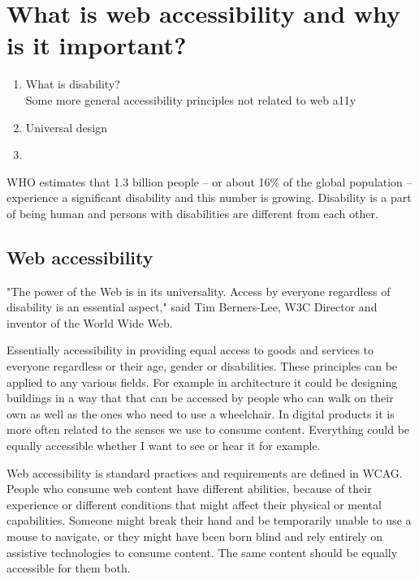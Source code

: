 \documentclass{master_thesis}
\begin{document}
\section{What is web accessibility and why is it important?}

\begin{enumerate}
	\item What is disability? \\
	Some more general accessibility principles not related to web a11y
	\item Universal design
	\item
\end{enumerate}

WHO estimates that 1.3 billion people – or about 16\% of the global population – experience a significant disability and this number is growing. Disability is a part of being human and persons with disabilities are different from each other. \citep{WHO2022}

\subsection{Web accessibility}
"The power of the Web is in its universality. Access by everyone regardless of disability is an essential aspect," said Tim Berners-Lee, W3C Director and inventor of the World Wide Web\citep{WWWC1997}.

Essentially accessibility in providing equal access to goods and services to everyone regardless or their age, gender or disabilities. These principles can be applied to any various fields. For example in architecture it could be designing buildings in a way that that can be accessed by people who can walk on their own as well as the ones who need to use a wheelchair. In digital products it is more often related to the senses we use to consume content. Everything could be equally accessible whether I want to see or hear it for example.

Web accessibility is standard practices and requirements are defined in WCAG. People who consume web content have different abilities, because of their experience or different conditions that might affect their physical or mental capabilities. Someone might break their hand and be temporarily unable to use a mouse to navigate, or they might have been born blind and rely entirely on assistive technologies to consume content. The same content should be equally accessible for them both.
\end{document}
